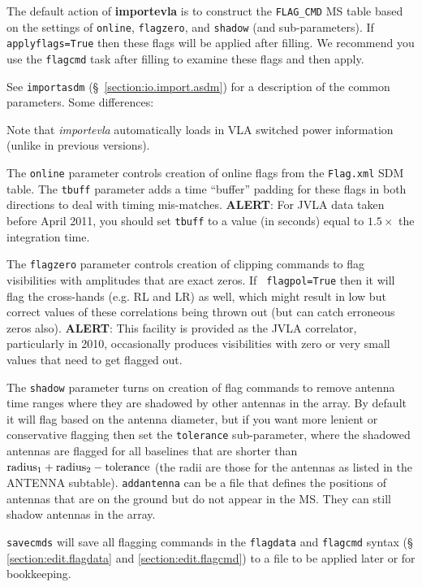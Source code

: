 The default action of {\bf importevla} is to construct the {\tt FLAG\_CMD} 
MS table based on the settings of {\tt online}, {\tt flagzero}, and
{\tt shadow} (and sub-parameters).  If {\tt applyflags=True} then these
flags will be applied after filling.  We recommend you use the {\tt flagcmd}
task after filling to examine these flags and then apply.

See {\tt importasdm} (\S~\ref{section:io.import.asdm}) for a
description of the common parameters.  Some differences:

Note that {\it importevla} automatically loads in VLA switched
power information (unlike in previous versions).

The {\tt online} parameter controls creation of online flags from the 
{\tt Flag.xml} SDM table. The {\tt tbuff} parameter adds a time ``buffer''
padding for these flags in both directions to deal with timing mis-matches.
{\bf ALERT}: For JVLA data taken before April 2011, you should set {\tt tbuff}
to a value (in seconds) equal to $1.5\times$ the integration time.

The {\tt flagzero} parameter controls creation of clipping commands to
flag visibilities with amplitudes that are exact zeros. If {\tt
  flagpol=True} then it will flag the cross-hands (e.g. RL and LR) as
well, which might result in low but correct values of these
correlations being thrown out (but can catch erroneous zeros also).
{\bf ALERT}: This facility is provided as the JVLA correlator,
particularly in 2010, occasionally produces visibilities with zero or
very small values that need to get flagged out.

The {\tt shadow} parameter turns on creation of flag commands to
remove antenna time ranges where they are shadowed by other antennas
in the array.  By default it will flag based on the antenna diameter,
but if you want more lenient or conservative flagging then set the
{\tt tolerance} sub-parameter, where the shadowed antennas are flagged
for all baselines that are shorter than ${\rm radius}_1 + {\rm
  radius}_2 - {\rm tolerance}$
(the radii are those for the antennas as listed in the ANTENNA
subtable). {\tt addantenna} can be a file that defines the positions
of antennas that are on the ground but do not appear in the MS. They
can still shadow antennas in the array. 

{\tt savecmds} will save all flagging commands in the {\tt flagdata}
and {\tt flagcmd} syntax (\S\,\ref{section:edit.flagdata} and
\ref{section:edit.flagcmd}) to a file to be applied later or for
bookkeeping. 

